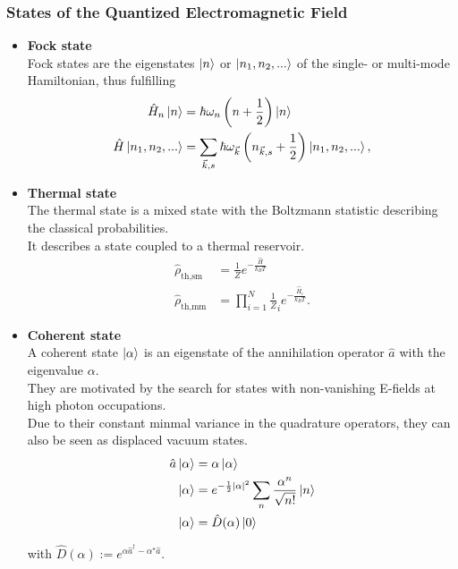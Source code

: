 \documentclass{article}
\newcommand{\lr}[1]{\left(#1\right)}
\begin{document}
\subsubsection{States of the Quantized Electromagnetic Field}
\begin{itemize}
	\item \textbf{Fock state}\\
	Fock states are the eigenstates $\ket{n}$ or $\ket{n_1, n_2, ...}$ of the single- or multi-mode Hamiltonian, thus fulfilling
		\begin{align}
			\hat{H}_n \ket{n} &= \hbar\omega_n \lr{ n + \frac{1}{2} } \ket{n} \\
			\hat{H}\ket{n_1, n_2, ...} &= \sum_{\vec{k},s} \hbar\omega_{\vec{k}} \lr{ n_{\vec{k},s} + \frac{1}{2} } \ket{n_1, n_2, ...},
		\end{align}


	\item \textbf{Thermal state}\\
	The thermal state is a mixed state with the Boltzmann statistic describing the classical probabilities.\\
	It describes a state coupled to a thermal reservoir.
		\begin{align}
			\hat{\rho}_\text{th,sm} &= \frac{1}{Z} e^{ -\frac{\hat{H}}{k_B T} } \\
			\hat{\rho}_\text{th,mm} &= \prod_{i=1}^N \frac{1}{Z}_i e^{ -\frac{\hat{H}_i}{k_B T} }.
		\end{align}
	
	
	\item \textbf{Coherent state}\\
	A coherent state $\ket{\alpha}$ is an eigenstate of the annihilation operator $\hat{a}$ with the eigenvalue $\alpha$.\\
	They are motivated by the search for states with non-vanishing E-fields at high photon occupations.\\
	Due to their constant minmal variance in the quadrature operators, they can also be seen as displaced vacuum states.
		\begin{align}
			\hat{a} \ket{\alpha} &= \alpha \ket{\alpha} \\
			\ket{\alpha} &= e^{-\frac{1}{2}|\alpha|^2} \sum_n \frac{\alpha^n}{\sqrt{n!}} \ket{n} \\
			\ket{\alpha} &= \hat{D}(\alpha) \ket{0}
		\end{align}
	
	with $\hat{D}(\alpha) := e^{\alpha \hat{a}^\dagger - \alpha^\star \hat{a}}$.



\end{itemize}
\end{document}
